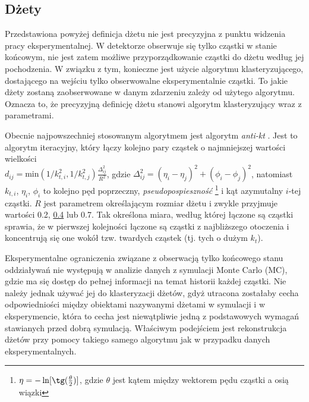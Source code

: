\subsection{Dżety}
\label{subsec:dzet-def}

Przedstawiona powyżej definicja dżetu nie jest precyzyjna z punktu widzenia pracy eksperymentalnej. W detektorze obserwuje się tylko cząstki w stanie końcowym, nie jest zatem możliwe przyporządkowanie cząstki do dżetu według jej pochodzenia. W związku z tym, konieczne jest użycie algorytmu klasteryzującego, dostającego na wejściu tylko obserwowalne eksperymentalnie cząstki. 
To jakie dżety zostaną zaobserwowane w danym zdarzeniu zależy od użytego algorytmu. Oznacza to, że precyzyjną definicję dżetu stanowi algorytm klasteryzujący wraz z parametrami. 

Obecnie najpowszechniej stosowanym algorytmem jest algorytm \textit{anti-kt} \cite{Cacciari:2008gp}.
Jest to algorytm iteracyjny, który łączy kolejno pary cząstek o najmniejszej wartości wielkości \\ $d_{ij}=\mathrm{min}(1/k_{t,i}^2, 1/k_{t,j}^2) \frac{\Delta_{ij}^2}{R^2}$, gdzie $\Delta_{ij}^2 = (\eta_i - \eta_j)^2 + (\phi_i - \phi_j)^2$, natomiast $k_{t,i}$, $\eta_i$, $\phi_i$ to kolejno pęd poprzeczny, \textit{pseudopospieszność}  \footnote{$\eta = -\ln[\tg(\frac{\theta}{2})]$, gdzie $\theta$ jest kątem między wektorem pędu cząstki a osią wiązki} i kąt azymutalny $i$-tej cząstki. $R$ jest parametrem określającym rozmiar dżetu i zwykle przyjmuje wartości 0.2, \underline{0.4} lub 0.7.
Tak określona miara, według której łączone są cząstki sprawia, że w pierwszej kolejności łączone są cząstki z najbliższego otoczenia i koncentrują się one wokół tzw. twardych cząstek (tj. tych o dużym $k_t$).



Eksperymentalne ograniczenia związane z obserwacją tylko końcowego stanu oddziaływań nie występują w analizie danych z symulacji Monte Carlo (MC), gdzie ma się dostęp do pełnej informacji na temat historii każdej cząstki. 
Nie należy jednak używać jej do klasteryzacji dżetów, gdyż utracona zostałaby cecha odpowiedniości między obiektami nazywanymi dżetami w symulacji i w eksperymencie, która to cecha jest niewątpliwie jedną z podstawowych wymagań stawianych przed dobrą symulacją. Właściwym podejściem jest rekonstrukcja dżetów przy pomocy takiego samego algorytmu jak w przypadku danych eksperymentalnych.


